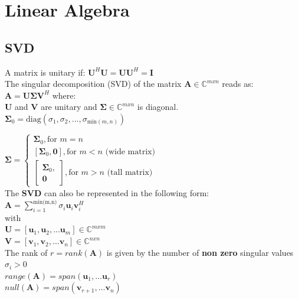\documentclass[english]{latex4ei/latex4ei_sheet}
\begin{document}
	\section{Linear Algebra}
\begin{sectionbox}
\subsection{SVD}
A matrix is unitary if: $\mathbf{U}^H\mathbf{U}=\mathbf{U}\mathbf{U}^H =\mathbf{I}$\\

The singular decomposition (SVD) of the matrix $\mathbf{A}\in\mathbb{C}^{mxn}$ reads as:\\
$\mathbf{A} = \mathbf{U}\mathbf{\Sigma}\mathbf{V}^H$ where:\\
$\mathbf{U}$ and $\mathbf{V}$ are unitary and $\mathbf{\Sigma}\in\mathbb{C}^{mxn}$ is diagonal.\\

$\mathbf{\Sigma}_0 = \text{diag}(\sigma_1, \sigma_2, ...,\sigma_{\text{min}(m,n)})$

$\mathbf{\Sigma} = \begin{cases}
	\mathbf{\Sigma}_0, \text{for } m=n\\
	[\mathbf{\Sigma}_0, \mathbf{0}], \text{for } m < n \text{ (wide matrix)}\\
	\begin{bmatrix}
		\mathbf{\Sigma}_0,\\
		\mathbf{0}
	\end{bmatrix}, \text{for } m > n \text{ (tall matrix)}
\end{cases}$\\

The \textbf{SVD} can also be represented in the following form:\\

$\mathbf{A} = \sum_{i=1}^{\text{min(m,n)}} \sigma_i \mathbf{u}_i\mathbf{v}_i^H$\\

with\\
$\mathbf{U} = [\mathbf{u}_1,\mathbf{u}_2,...\mathbf{u}_m] \in\mathbb{C}^{mxm}$\\
$\mathbf{V} = [\mathbf{v}_1, \mathbf{v}_2, ...\mathbf{v}_n] \in\mathbb{C}^{nxn}$\\

The rank of $r=rank(\mathbf{A})$ is given by the number of \textbf{non zero} singular values $\sigma_i>0$\\
$range(\mathbf{A}) = span(\mathbf{u}_1,...\mathbf{u}_r)$\\
$null(\mathbf{A}) = span(\mathbf{v}_{r+1},  ...\mathbf{v}_n)$\\


\end{sectionbox}
\end{document}
